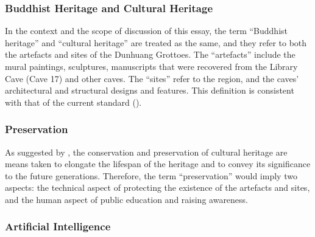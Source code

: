 \subsubsection{Buddhist Heritage and Cultural Heritage}

In the context and the scope of discussion of this essay, the term ``Buddhist heritage'' and ``cultural
heritage'' are treated as the same, and they refer to both the artefacts and sites of the Dunhuang Grottoes.
The ``artefacts'' include the mural paintings, sculptures, manuscripts that were recovered from the Library
Cave (Cave 17) and other caves. The ``sites'' refer to the region, and the caves' architectural and structural
designs and features. This definition is consistent with that of the current standard
().

\subsubsection{Preservation}

As suggested by , the conservation and preservation of cultural heritage
are means taken to elongate the lifespan of the heritage and to convey its significance to the future
generations. Therefore, the term ``preservation'' would imply two aspects: the technical aspect of 
protecting the existence of the artefacts and sites, and the human aspect of public education and raising
awareness.

\subsubsection{Artificial Intelligence}

\printbibliography